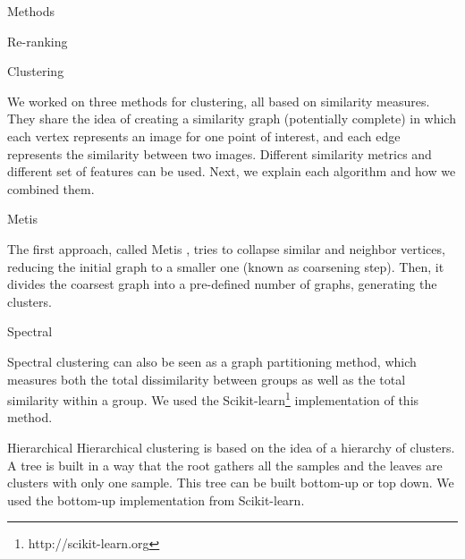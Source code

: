 \documentclass{acm_proc_article-me}
\begin{document}
\begin{section}{Methods}
\begin{subsection}{Re-ranking}
\end{subsection}


\begin{subsection}{Clustering}

We worked on three methods for clustering, all based on similarity measures.
They share the idea of creating a similarity graph (potentially complete) in which each vertex represents an image for one point of interest, and
each edge represents the similarity between two images. Different similarity metrics and different set of features can be used.
Next, we explain each algorithm and how we combined them.


\begin{subsubsection}{Metis}

The first approach, called Metis \cite{metis},
tries to collapse similar and neighbor vertices, reducing the initial graph to a smaller one (known as coarsening step).
Then, it divides the coarsest graph into a pre-defined number of graphs, generating the clusters.  

\end{subsubsection}

\begin{subsubsection}{Spectral}

Spectral clustering \cite{spectral} can also be seen as a graph partitioning method, which measures both the total dissimilarity between groups 
as well as the total similarity within a group. We used the 
Scikit-learn\footnote{http://scikit-learn.org} 
implementation of this method. 


\end{subsubsection}

\begin{subsubsection}{Hierarchical}
Hierarchical clustering \cite{hierarchical} is based on the idea of a hierarchy of clusters. A tree is built in a way that the root gathers all the samples and the leaves are clusters with only one sample. This tree can be built bottom-up or top down. We used the bottom-up implementation from 
Scikit-learn.


\end{subsubsection}
\end{subsection}
\end{section}
\end{document}
